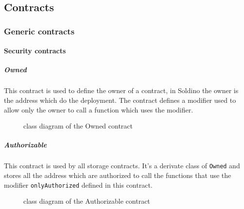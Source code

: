 \subsection{Contracts}
\subsubsection{Generic contracts}
\paragraph{Security contracts}
\subparagraph{Owned}
This contract is used to define the owner of a contract, in Soldino the owner is the address which 
do the deployment. The contract defines a modifier used to allow only the owner to call a function which uses the modifier.
\begin{figure}[H]
	\centering
	\caption{class diagram of the Owned contract}
\end{figure}

\subparagraph{Authorizable}
This contract is used by all storage contracts. It's a derivate class of \texttt{Owned} and stores 
all the address which are authorized to call the functions that use the modifier \texttt{onlyAuthorized} defined in this contract.
\begin{figure}[H]
	\centering
	\caption{class diagram of the Authorizable contract}
\end{figure}
\pagebreak
